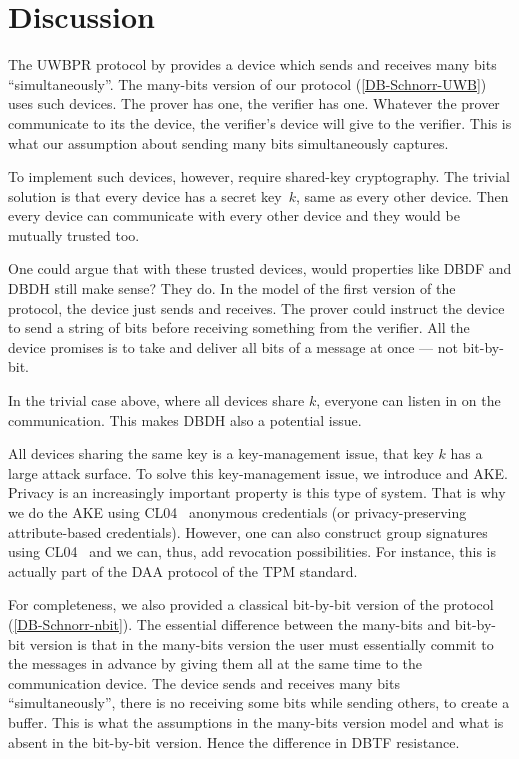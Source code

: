 \section{Discussion}%
\label{Discussion}

The UWBPR protocol by \textcite{UWBPR} provides a device which sends and 
receives many bits \enquote{simultaneously}.
The many-bits version of our protocol (\cref{DB-Schnorr-UWB}) uses such 
devices.
The prover has one, the verifier has one.
Whatever the prover communicate to its the device, the verifier's device will 
give to the verifier.
This is what our assumption about sending many bits simultaneously captures.

To implement such devices, however, require shared-key cryptography.
The trivial solution is that every device has a secret key~\(k\), same as every 
other device.
Then every device can communicate with every other device and they would be 
mutually trusted too.

One could argue that with these trusted devices, would properties like 
\ac{DBDF} and \ac{DBDH} still make sense?
They do.
In the model of the first version of the protocol, the device just sends and 
receives.
The prover could instruct the device to send a string of bits before receiving 
something from the verifier.
All the device promises is to take and deliver all bits of a message at once 
--- not bit-by-bit.

In the trivial case above, where all devices share \(k\), everyone can listen 
in on the communication.
This makes \ac{DBDH} also a potential issue.

All devices sharing the same key is a key-management issue, that key \(k\) has 
a large attack surface.
To solve this key-management issue, we introduce  and \ac{AKE}.
Privacy is an increasingly important property is this type of system.
That is why we do the \ac{AKE} using CL04~\cite{CLsignatures} anonymous 
credentials (or privacy-preserving attribute-based credentials).
However, one can also construct group signatures using CL04~\cite{CLsignatures} 
and we can, thus, add revocation possibilities.
For instance, this is actually part of the \ac{DAA} protocol of the \ac{TPM} 
standard.

For completeness, we also provided a classical bit-by-bit version of the 
protocol (\cref{DB-Schnorr-nbit}).
The essential difference between the many-bits and bit-by-bit version is that 
in the many-bits version the user must essentially commit to the messages in 
advance by giving them all at the same time to the communication device.
The device sends and receives many bits \enquote{simultaneously}, there is no 
receiving some bits while sending others, to create a buffer.
This is what the assumptions in the many-bits version model and what is absent 
in the bit-by-bit version.
Hence the difference in \ac{DBTF} resistance.

